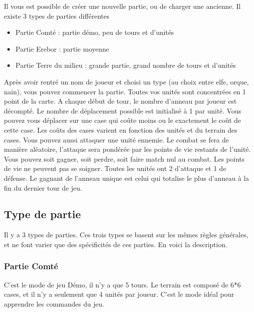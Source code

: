 Il vous est possible de créer une nouvelle partie, ou de charger une ancienne.
Il existe 3 types de parties différentes
\begin{itemize}
\item Partie Comté : partie démo, peu de tours et d'unités
\item Partie Erebor : partie moyenne
\item Partie Terre du milieu : grande partie, grand nombre de tours et d'unités
\newline
\end{itemize}
Après avoir rentré un nom de joueur et choisi un type (au choix entre elfe, orque, nain), vous
pouvez commencer la partie. Toutes vos unités sont concentrées en 1 point de la carte.
\newline
\newline
A chaque début de tour, le nombre d'anneau par joueur est décompté. Le nombre de déplacement possible est initialisé à 1 par unité. 
Vous pouvez vous déplacer sur une case qui coûte moins ou le exactement le coût de cette case. Les coûts des cases varient en fonction des unités et du terrain des cases. 
\newline
\newline
Vous pouvez aussi attaquer une unité ennemie. Le combat se fera de manière aléatoire, l'attaque sera pondérée par les points de vie restants de l'unité. Vous pouvez soit gagner, soit perdre, soit faire match nul au combat. Les points de vie ne peuvent pas se soigner.
Toutes les unités ont 2 d'attaque et 1 de défense.
\newline
\newline
Le gagnant de l'anneau unique est celui qui totalise le plus d'anneau à la fin du dernier tour de jeu.

\newpage
\subsection{Type de partie}

Il y a 3 types de parties. Ces trois types se basent sur les mêmes règles générales, et ne font varier que des spécificités de ces parties. En voici la description.
\subsubsection{Partie Comté}
C'est le mode de jeu Démo, il n'y a que 5 tours. Le terrain est composé de 6*6 cases, et il n'y a seulement que 4 unités par joueur. C'est le mode idéal pour apprendre les commandes du jeu.
